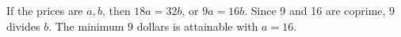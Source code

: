 If the prices are $ a,b $, then $ 18a=32b $, or $ 9a=16b $. Since 9 and 16 are coprime, $ 9 $ divides $ b $. The minimum $\boxed9 $ dollars is attainable with $ a=16 $.
